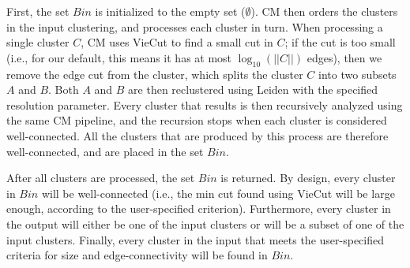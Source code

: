\documentclass[11pt]{article}   	%
\begin{document}
First, the set $Bin$ is initialized to the empty set  ($\emptyset$).
CM  then orders the clusters in the input clustering, and   processes each cluster in  turn.
When processing a single cluster $C$,
CM uses VieCut to find a small cut in $C$;  if the cut is too small (i.e., for our default, this means it has at most $\log_{10}(||C||)$ edges), then
we remove the edge cut from the cluster, which splits the cluster $C$ into two  subsets $A$ and $B$.
Both $A$ and $B$ are then reclustered using Leiden with the specified resolution parameter.
Every cluster that results is then recursively analyzed using the same CM pipeline, and the recursion stops when each cluster is considered well-connected.
All the clusters that are produced by this process are therefore well-connected, and are placed in the set $Bin$.

After all clusters are processed, the set $Bin$ is returned.
By design, every cluster in  $Bin$ will be well-connected (i.e., the min cut found using VieCut will be large enough, according to the user-specified criterion).
Furthermore, every cluster in the output will either be one of the input clusters or will be a subset of one of the input clusters.
Finally, every cluster in the input that meets the user-specified criteria for size and edge-connectivity will be found in $Bin$.
\end{document}
